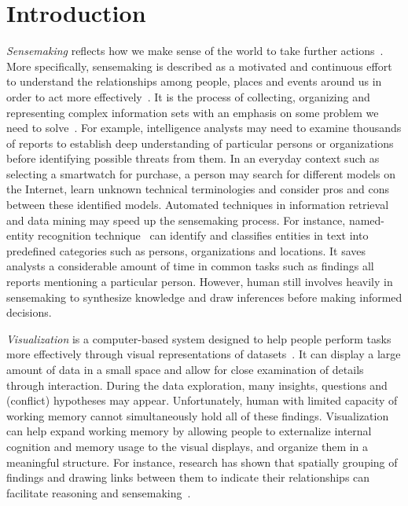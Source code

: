 \chapter{Introduction}

\graphicspath{{Chapter1/figures/}}



\emph{Sensemaking} reflects how we make sense of the world to take further actions~\cite{Snowden2005}. More specifically, sensemaking is described as a motivated and continuous effort to understand the relationships among people, places and events around us in order to act more effectively~\cite{Klein2006a}. It is the process of collecting, organizing and representing complex information sets with an emphasis on some problem we need to solve~\cite{Russell2008}. For example, intelligence analysts may need to examine thousands of reports to establish deep understanding of particular persons or organizations before identifying possible threats from them. In an everyday context such as selecting a smartwatch for purchase, a person may search for different models on the Internet, learn unknown technical terminologies and consider pros and cons between these identified models. Automated techniques in information retrieval and data mining may speed up the sensemaking process. For instance, named-entity recognition technique~\cite{Nadeau2007} can identify and classifies entities in text into predefined categories such as persons, organizations and locations. It saves analysts a considerable amount of time in common tasks such as findings all reports mentioning a particular person. However, human still involves heavily in sensemaking to synthesize knowledge and draw inferences before making informed decisions.

\emph{Visualization} is a computer-based system designed to help people perform tasks more effectively through visual representations of datasets~\cite{Munzner2014}. It can display a large amount of data in a small space and allow for close examination of details through interaction. During the data exploration, many insights, questions and (conflict) hypotheses may appear. Unfortunately, human with limited capacity of working memory cannot simultaneously hold all of these findings. Visualization can help expand working memory by allowing people to externalize internal cognition and memory usage to the visual displays, and organize them in a meaningful structure. For instance, research has shown that spatially grouping of findings and drawing links between them to indicate their relationships can facilitate reasoning and sensemaking~\cite{Sedig2013}.

